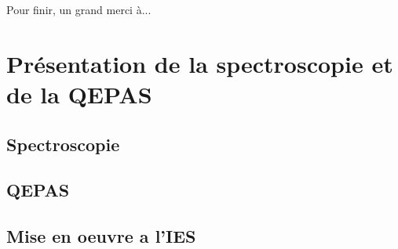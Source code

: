 \documentclass[a4paper]{report}
\begin{document}
Pour finir, un grand merci à... %
		

	
	
	\renewcommand*\contentsname{Sommaire} %
	\tableofcontents
	\pagebreak
	
	
	
	
	
	\renewcommand{\chaptername}{Partie} %
	\chapter{Présentation de la spectroscopie et de la QEPAS}
	
	\section{Spectroscopie}
	\section{QEPAS}
	\section{Mise en oeuvre a l'IES}
\end{document}
